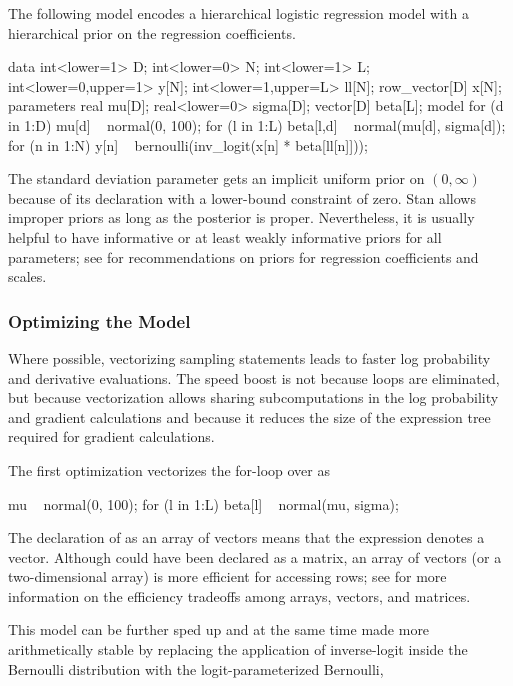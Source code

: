 The following model encodes a hierarchical logistic regression model
with a hierarchical prior on the regression coefficients.
%

\begin{stancode}
data {
  int<lower=1> D;
  int<lower=0> N;
  int<lower=1> L;
  int<lower=0,upper=1> y[N];
  int<lower=1,upper=L> ll[N];
  row_vector[D] x[N];
}
parameters {
  real mu[D];
  real<lower=0> sigma[D];
  vector[D] beta[L];
}
model {
  for (d in 1:D) {
    mu[d] ~ normal(0, 100);
    for (l in 1:L)
      beta[l,d] ~ normal(mu[d], sigma[d]);
  }
  for (n in 1:N)
    y[n] ~ bernoulli(inv_logit(x[n] * beta[ll[n]]));
}
\end{stancode}  
%
The standard deviation parameter  gets an implicit uniform
prior on $(0,\infty)$ because of its declaration with a lower-bound
constraint of zero.  Stan allows improper priors as long as the
posterior is proper.  Nevertheless, it is usually helpful to have
informative or at least weakly informative priors for all parameters;
see  for recommendations on priors for
regression coefficients and scales.

\subsubsection{Optimizing the Model}

Where possible, vectorizing sampling statements leads to faster log
probability and derivative evaluations.  The speed boost is not
because loops are eliminated, but because vectorization allows sharing
subcomputations in the log probability and gradient calculations and
because it reduces the size of the expression tree required for
gradient calculations.

The first optimization vectorizes the for-loop over  as
%

\begin{stancode}
  mu ~ normal(0, 100);
  for (l in 1:L)
    beta[l] ~ normal(mu, sigma);
\end{stancode}
%
The declaration of  as an array of vectors means that the
expression  denotes a vector.  Although 
could have been declared as a matrix, an array of vectors (or a
two-dimensional array) is more efficient for accessing rows; see
 for more information on the efficiency
tradeoffs among arrays, vectors, and matrices.

This model can be further sped up and at the same time made more
arithmetically stable by replacing the application of inverse-logit
inside the Bernoulli distribution with the logit-parameterized
Bernoulli,
%


